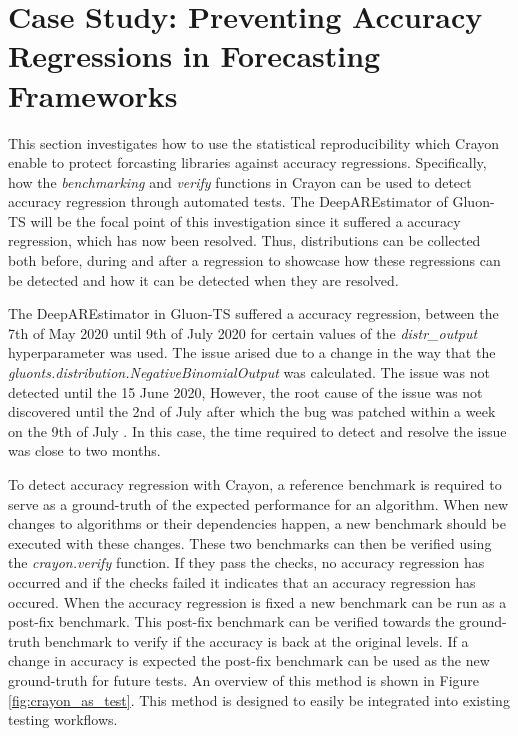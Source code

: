 \section{Case Study: Preventing Accuracy Regressions in Forecasting Frameworks}
\label{sec:crayon_case_study}
This section investigates how to use the statistical reproducibility which Crayon enable to protect forcasting libraries against accuracy regressions. Specifically, how the \textit{benchmarking} and \textit{verify} functions in Crayon can be used to detect accuracy regression through automated tests. The DeepAREstimator of Gluon-TS will be the focal point of this investigation since it suffered a accuracy regression, which has now been resolved. Thus, distributions can be collected both before, during and after a regression to showcase how these regressions can be detected and how it can be detected when they are resolved.

The DeepAREstimator in Gluon-TS suffered a accuracy regression, between the 7th of May 2020 until 9th of July 2020 for certain values of the \textit{distr\_output} hyperparameter was used. The issue arised due to a change in the way that the \textit{gluonts.distribution.NegativeBinomialOutput} was calculated. The issue was not detected until the 15 June 2020, However, the root cause of the issue was not discovered until the 2nd of July after which the bug was patched within a week on the 9th of July \cite{gluonts_deepar_bugged, gluonts_deepar_bugged_found, gluonts_deepar_patched}. In this case, the time required to detect and resolve the issue was close to two months.

To detect accuracy regression with Crayon, a reference benchmark is required to serve as a ground-truth of the expected performance for an algorithm. When new changes to algorithms or their dependencies happen, a new benchmark should be executed with these changes. These two benchmarks can then be verified using the \textit{crayon.verify} function. If they pass the checks, no accuracy regression has occurred and if the checks failed it indicates that an accuracy regression has occured. When the accuracy regression is fixed a new benchmark can be run as a post-fix benchmark. This post-fix benchmark can be verified towards the ground-truth benchmark to verify if the accuracy is back at the original levels. If a change in accuracy is expected the post-fix benchmark can be used as the new ground-truth for future tests. An overview of this method is shown in Figure \ref{fig:crayon_as_test}. This method is designed to easily be integrated into existing testing workflows.

